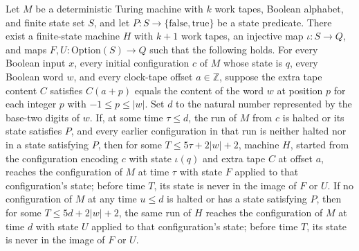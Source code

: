 \begin{theorem}
\label{Turing.exists_stepClockTM}
\leanok
{}
Let $M$ be a deterministic Turing machine with $k$ work tapes, Boolean alphabet, and
finite state set $S$, and let $P:S\to\{\mathrm{false},\mathrm{true}\}$ be a state
predicate. There exist a finite-state machine $H$ with $k+1$ work tapes, an injective
map $\iota:S\to Q$, and maps $F,U:\mathrm{Option}(S)\to Q$ such that the following
holds. For every Boolean input $x$, every initial configuration $c$ of $M$ whose state
is $q$, every Boolean word $w$, and every clock-tape offset $a\in\mathbb Z$, suppose the
extra tape content $C$ satisfies $C(a+p)$ equals the content of the word $w$ at position
$p$ for each integer $p$ with $-1\le p\le |w|$. Set $d$ to the natural number
represented by the base-two digits of $w$. If, at some time $\tau\le d$, the run of $M$
from $c$ is halted or its state satisfies $P$, and every earlier configuration in that
run is neither halted nor in a state satisfying $P$, then for some $T\le 5\tau+2|w|+2$,
machine $H$, started from the configuration encoding $c$ with state $\iota(q)$ and extra
tape $C$ at offset $a$, reaches the configuration of $M$ at time $\tau$ with state $F$
applied to that configuration's state; before time $T$, its state is never in the image
of $F$ or $U$. If no configuration of $M$ at any time $u\le d$ is halted or has a state
satisfying $P$, then for some $T\le 5d+2|w|+2$, the same run of $H$ reaches the
configuration of $M$ at time $d$ with state $U$ applied to that configuration's state;
before time $T$, its state is never in the image of $F$ or $U$.
\end{theorem}
